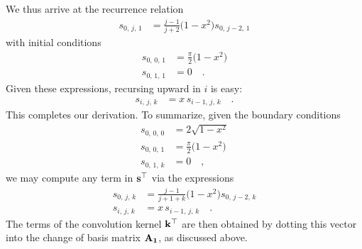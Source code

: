 \documentclass[modern]{aastex62}
\newcommand{\sT}{\bvec{s}^\top}
\newcommand{\AOne}{\bvec{A_1}}
\newcommand{\kT}{\bvec{k}^\top}
\begin{document}
%
We thus arrive at the recurrence relation
%
\begin{align}
    s_{0,\,j,\,1} &= \frac{j - 1}{j + 2} \big(1 - x^2\big) s_{0,\,j-2,\,1}
\end{align}
%
with initial conditions
%
\begin{align}
    s_{0,\,0,\,1} &= \frac{\pi}{2} \big(1-x^2\big) \nonumber \\
    s_{0,\,1,\,1} &= 0 \quad.
\end{align}
%
Given these expressions, recursing upward in $i$ is easy:
%
\begin{align}
    s_{i,\,j,\,k} &= x \, s_{i-1,\,j,\,k} \quad.
\end{align}
%
This completes our derivation. To summarize, given the boundary conditions
%
\begin{align}
    s_{0,\,0,\,0} &= 2 \sqrt{1-x^2} \nonumber \\
    s_{0,\,0,\,1} &= \frac{\pi}{2} \big(1-x^2\big) \nonumber \\
    s_{0,\,1,\,k} &= 0 \quad ,
\end{align}
%
we may compute any term in $\sT$ via the expressions
%
\begin{align}
    \label{eq:kT:sTrecurrence}
    s_{0,\,j,\,k} &= \frac{j - 1}{j + 1 + k} \big(1 - x^2\big) s_{0,\,j-2,\,k} \nonumber \\
    s_{i,\,j,\,k} &= x \, s_{i-1,\,j,\,k} \quad.
\end{align}
%
The terms of the convolution kernel $\kT$ are then obtained by dotting
this vector into the change of basis matrix $\AOne$, as discussed above.


\end{document}
